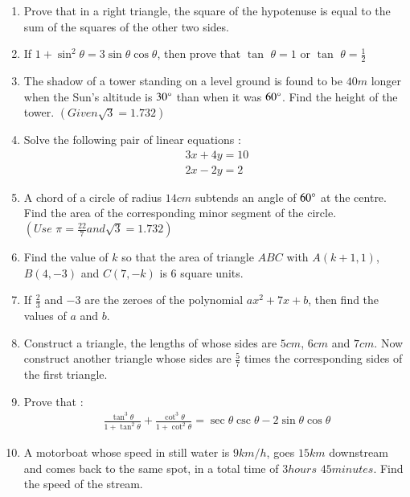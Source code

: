 \documentclass[2pt,-letter paper]{article}
\providecommand{\brak}[1]{\ensuremath{\left(#1\right)}}
\begin{document}
\begin{enumerate}
\item Prove that in a right triangle, the square of the hypotenuse is equal to the sum of the squares of the other two sides.

\item If $1 + \sin^2 \theta  = 3 \sin \theta \cos \theta$, then prove that $\tan$ $\theta = 1 $ or $\tan$ $\theta = \frac{1}{2}$



\item The shadow of a tower standing on a level ground is found to be $40 m$ longer when the Sun's altitude is $30\degree$ than when it was $60\degree$. Find the height of the tower. $(Given \sqrt{3} = 1.732)$

\item  Solve the following pair of linear equations :
\begin{align}
    3x + 4y = 10\\
2x - 2y = 2
\end{align}


\item A chord of a circle of radius $14 cm$ subtends an angle of $60\degree$ at the centre. Find the area of the corresponding minor segment of the circle.
$\brak{Use \hspace{4pt}\pi=\frac{22}{7} and \sqrt{3} = 1.732}$

\item Find the value of $k$ so that the area of triangle $ABC$ with $A\brak{k + 1, 1}$, $B\brak{4, -3}$ and $C\brak{7, -k}$ is $6$ square units.

\item If $\frac{2}{3}$ and $-3$ are the zeroes of the polynomial $ax^2 + 7x + b$, then find the values of $a$ and $b$.

\item Construct a triangle, the lengths of whose sides are $5 cm$, $6 cm$ and $7 cm$. Now construct another triangle whose sides are $\frac{5}{7}$ times the corresponding sides of the first triangle.

\item Prove that :
\begin{align*}
\frac{\tan^3 \theta}{1+\tan^2 \theta} + \frac{\cot^3 \theta}{1 + \cot^2 \theta} =  \sec \theta  \csc  \theta - 2 \sin \theta \cos \theta  
\end{align*}


\item A motorboat whose speed in still water is $9 km/h$, goes $15km$ downstream and comes back to the same spot, in a total time of $3 hours$ $45 minutes$. Find the speed of the stream.

\end{enumerate}
\end{document}
